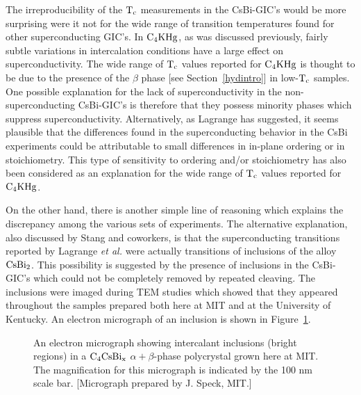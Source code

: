 	The   irreproducibility   of the  $\rm  T_c$   measurements in  the
CsBi-GIC's would   be more surprising  were  it not for the  wide  range of
transition    temperatures    found      for      other     superconducting
GIC's.\cite{erice:scy} In $\rm C_4KHg$, as was discussed previously, fairly
subtle  variations in  intercalation conditions  have  a   large effect  on
superconductivity.  The wide  range of $\rm  T_c$ values reported  for $\rm
C_4KHg$ is  thought to be due  to the  presence of the  $\beta$  phase [see
Section~\ref{hydintro}]    in low-$\rm    T_c$    samples.   One  possible
explanation for the lack  of  superconductivity in  the non-superconducting
CsBi-GIC's is therefore that they  possess minority phases  which  suppress
superconductivity.       Alternatively,         as         Lagrange     has
suggested,\cite{lagrange87} it  seems plausible that the  differences found
in the  superconducting    behavior in  the    CsBi  experiments   could be
attributable  to  small  differences  in    in-plane   ordering  or   in
stoichiometry.   This type of  sensitivity to ordering and/or stoichiometry
has also been considered as an explanation for the wide  range of $\rm T_c$
values reported for $\rm C_4KHg$.\cite{Z234}

	On the other hand, there is another simple line  of reasoning which
explains  the  discrepancy among  the various  sets   of  experiments.  The
alternative     explanation,   also      discussed   by     Stang       and
coworkers,\cite{stang88} is  that the  superconducting transitions reported
by Lagrange  {\em et al.}  were  actually transitions of inclusions of  the
alloy  $\rm CsBi_2$.   This possibility   is suggested  by the  presence of
inclusions in  the CsBi-GIC's which could  not   be  completely  removed by
repeated  cleaving.  The inclusions   were imaged during  TEM studies which
showed that they appeared throughout the samples prepared  both here at MIT
and at the University of Kentucky.\cite{speck88z}   An electron micrograph of
an inclusion is shown in Figure~\ref{inclusion}.

\begin{figure}
\vspace{15cm}
\caption[Electron micrograph of intercalant inclusions in a CsBi-GIC]{An
electron   micrograph showing   intercalant  inclusions (bright regions)   in  a   $\rm
C_4CsBi_{x}$  $\alpha + \beta$-phase polycrystal  grown  here at  MIT.  The
magnification for  this  micrograph is indicated by  the  100 nm scale bar.
[Micrograph prepared by J. Speck, MIT.]}
\label{inclusion}
\end{figure}


